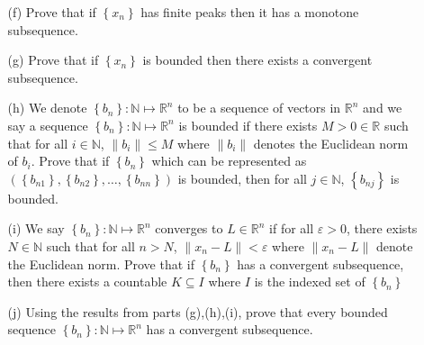 \documentclass[letterpaper,12pt]{article}
\newcommand{\set}[1]{\left\{ #1 \right\}}
\theoremstyle{definition}
\begin{document}
\pagebreak
\begin{enumerate}
    \item[] \begin{enumerate}
        \item[(f)] Prove that if $\set{x_n}$ has finite peaks then it has a monotone subsequence. 
    \end{enumerate}
\end{enumerate}
\pagebreak
\begin{enumerate}
    \item[] \begin{enumerate}
        \item[(g)] Prove that if $\set{x_n}$ is bounded then there exists a convergent subsequence.
    \end{enumerate}
\end{enumerate}
\pagebreak
\begin{enumerate}
    \item[] \begin{enumerate}
        \item[(h)] We denote $\set{b_n} : \mathbb{N} \mapsto \mathbb{R}^n$ to be a sequence of vectors in $ \mathbb{R}^n$ and we say a sequence $\set{b_n} : \mathbb{N} \mapsto \mathbb{R}^n$ is bounded if there exists $M >0 \in \mathbb{R}$ such that for all $i \in \mathbb{N}$, $\|b_i \| \leq M$ where $\| b_i \|$ denotes the Euclidean norm of $b_i$. Prove that if $\set{b_n}$ which can be represented as $(\set{b_{n1}},\set{b_{n2}},\ldots,\set{b_{nn}})$ is bounded, then for all $j \in \mathbb{N}$, $\set{b_{nj}}$ is bounded.
    \end{enumerate}
\end{enumerate}
\pagebreak
\begin{enumerate}
    \item[] \begin{enumerate}
        \item[(i)] We say $\set{b_n} : \mathbb{N} \mapsto \mathbb{R}^n$ converges to $L \in \mathbb{R}^n$ if for all $\varepsilon > 0$, there exists $N \in \mathbb{N}$ such that for all $n > N$, $\|x_n - L \| < \varepsilon$ where $\|x_n-L\|$ denote the Euclidean norm. Prove that if $\set{b_n}$ has a convergent subsequence, then there exists a countable $K \subseteq I$ where $I$ is the indexed set of $\set{b_n}$
    \end{enumerate}
\end{enumerate}
\pagebreak
\begin{enumerate}
    \item[] \begin{enumerate}
        \item[(j)] Using the results from parts (g),(h),(i), prove that every bounded sequence $\set{b_n}: \mathbb{N} \mapsto \mathbb{R}^n$ has a convergent subsequence.
    \end{enumerate}
\end{enumerate}
\end{document}
